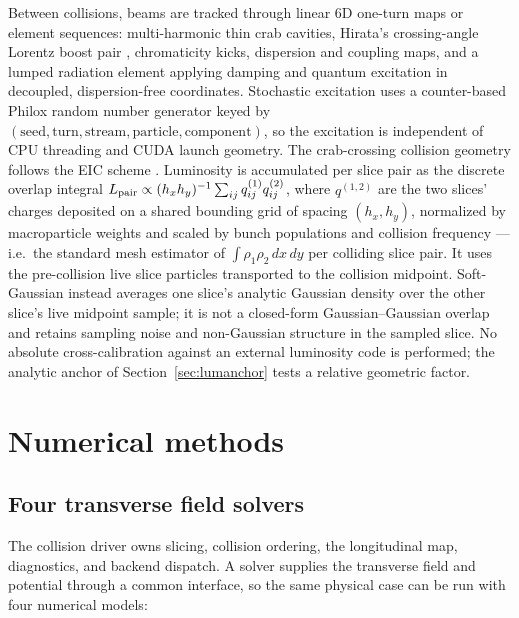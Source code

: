 \documentclass[a4paper,fleqn]{cas-sc}
\begin{document}
Between collisions, beams are tracked through linear 6D one-turn maps or
element sequences: multi-harmonic thin crab cavities, Hirata's crossing-angle
Lorentz boost pair \citep{Hirata1995}, chromaticity kicks, dispersion and
coupling maps, and a lumped radiation element applying damping and quantum
excitation in decoupled, dispersion-free coordinates.  Stochastic excitation
uses a counter-based Philox random number generator \citep{Salmon2011} keyed by
$(\text{seed},\text{turn},\text{stream},\text{particle},\text{component})$,
so the excitation is independent of CPU threading and CUDA launch geometry.
The crab-crossing collision geometry follows the EIC scheme
\citep{XuCrab2021,XuBB2024}.  Luminosity is accumulated per slice
pair as the discrete overlap integral
$L_{\rm pair}\propto (h_xh_y)^{-1}\sum_{ij} q^{(1)}_{ij}q^{(2)}_{ij}$,
where $q^{(1,2)}$ are the two slices' charges deposited on a shared
bounding grid of spacing $(h_x,h_y)$, normalized by macroparticle
weights and scaled by bunch populations and collision frequency ---
i.e.\ the standard mesh estimator of $\int\rho_1\rho_2\,dx\,dy$ per
colliding slice pair.  It uses the pre-collision live slice particles
transported to the collision midpoint.  Soft-Gaussian instead averages one
slice's analytic Gaussian density over the other slice's live midpoint
sample; it is not a closed-form Gaussian--Gaussian overlap and retains
sampling noise and non-Gaussian structure in the sampled slice.  No absolute
cross-calibration against an external luminosity code is performed; the
analytic anchor of Section~\ref{sec:lumanchor} tests a relative geometric
factor.

\section{Numerical methods}
\label{sec:methods}

\subsection{Four transverse field solvers}
\label{sec:solvers}

The collision driver owns slicing, collision ordering, the longitudinal
map, diagnostics, and backend dispatch.  A solver supplies the transverse
field and potential through a common interface, so the same physical case
can be run with four numerical models:
\end{document}
